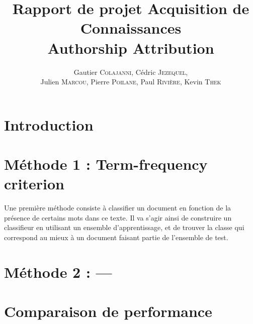 \documentclass[a4paper]{article}
\author{Gautier \textsc{Colajanni}, Cédric \textsc{Jezequel},\\ Julien \textsc{Marcou}, Pierre \textsc{Poilane}, Paul \textsc{Rivière}, Kevin \textsc{Thek}}
\title{Rapport de projet Acquisition de Connaissances \\ Authorship Attribution}
\begin{document}
\maketitle

\section{Introduction}

\section{Méthode 1 : Term-frequency criterion}
Une première méthode consiste à classifier un document en fonction de la présence de certains mots dans ce texte. Il va s'agir ainsi de construire un classifieur en utilisant un ensemble d'apprentissage, et de trouver la classe qui correspond au mieux à un document faisant partie de l'ensemble de test.

\section{Méthode 2 : ---}

\section{Comparaison de performance}
\end{document}
